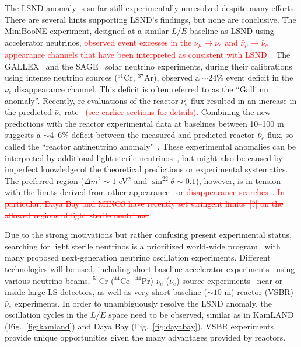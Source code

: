 \documentclass[aps,twocolumn,preprintnumbers,amsmath,superscriptaddress,amssymb,floats,nofootinbib]{revtex4-1}
\begin{document}
The LSND anomaly is so-far still experimentally unresolved despite many efforts. 
There are several hints supporting LSND's findings, but none are conclusive.
The MiniBooNE experiment, designed at a similar $L/E$ baseline as LSND using accelerator neutrinos, \textcolor{red}{observed event excesses in the $\nu_{\mu}\rightarrow\nu_e$ and $\bar\nu_{\mu}\rightarrow\bar\nu_e$ appearance channels that have been interpreted as consistent with LSND~\cite{MiniBooNE2007,MiniBooNE2013}.} 
The GALLEX~\cite{GALLEX2010} and the SAGE~\cite{SAGE2009} solar neutrino experiments, during their calibrations using intense neutrino sources ($^{51}$Cr, $^{37}$Ar), observed a $\sim$24\% event deficit in the $\nu_e$ disappearance channel. 
This deficit is often referred to as the ``Gallium anomaly''. 
Recently, re-evaluations of the reactor $\bar\nu_e$ flux resulted in an increase in the predicted $\bar\nu_e$ rate~\cite{Mueller, Huber} \textcolor{red}{(see earlier sections for details).} 
Combining the new predictions with the reactor experimental data at baselines between 10--100 m~\cite{ILL,Gosgen,Rovno,Krasnoyarsk,SRP,Bugey4,Bugey3} suggests a $\sim$4--6\% deficit between the measured and predicted reactor $\bar\nu_e$ flux, so-called the ``reactor antineutrino anomaly"~\cite{Mention,Zhang13}. 
These experimental anomalies can be interpreted by additional light sterile neutrinos~\cite{Guinti2011}, but might also be caused by imperfect knowledge of the theoretical predictions or experimental systematics.  
The preferred region ($\Delta{m}^2\sim1$ eV$^2$ and $\sin^22\theta\sim0.1$), however, is in tension with the limits derived from other appearance~\cite{KARMEN2002,NOMAD03,OPERA13,ICARUS13} or \textcolor{red}{disappearance searches~\cite{Stockdale84,Dydak84,MiniBooNE12-nubar,MiniBooNE12-nu,SuperK2000,MINOS11-NC,Bugey3,Conrad12,Sousa-Neutrino14,DayaBaySterile}.} \textcolor{red}{\st{In particular, Daya Bay and MINOS have recently set stringent limits~[?] on the allowed regions of light sterile neutrinos.}}

Due to the strong motivations but rather confusing present experimental status, searching for light sterile neutrinos is a prioritized world-wide program~\cite{sterileWP} with many proposed next-generation neutrino oscillation experiments.
Different technologies will be used, including short-baseline accelerator experiments~\cite{IsoDAR,OscSNS,NESSiE,LAr1-ND,nuSTORM} using various neutrino beams, $^{51}$Cr ($^{44}$Ce-$^{144}$Pr) $\nu_e$ ($\bar\nu_e$) source experiments~\cite{Cribier2011,Dwyer2013,SOX,CeLAND} near or inside large LS detectors, as well as very short-baseline ($\sim10$ m) reactor (VSBR) $\bar\nu_e$ experiments. 
In order to unambiguously resolve the LSND anomaly, the oscillation cycles in the $L/E$ space need to be observed, similar as in KamLAND (Fig.~\ref{fig:kamland}) and Daya Bay (Fig.~\ref{fig:dayabay}). VSBR experiments provide unique opportunities given the many advantages provided by reactors.
\end{document}
